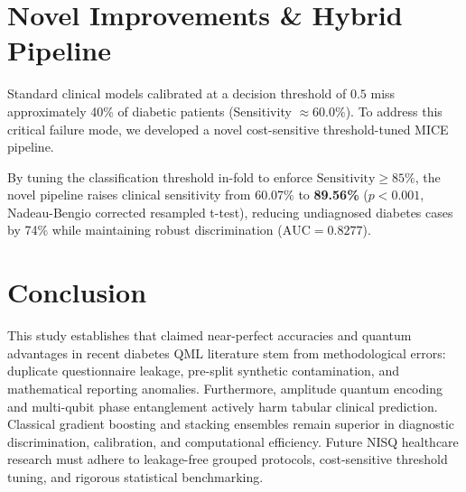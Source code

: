 \documentclass[10pt,journal,compsoc]{IEEEtran}
\begin{document}
\section{Novel Improvements \& Hybrid Pipeline}
Standard clinical models calibrated at a decision threshold of $0.5$ miss approximately 40\% of diabetic patients (Sensitivity $\approx 60.0\%$). To address this critical failure mode, we developed a novel cost-sensitive threshold-tuned MICE pipeline.

\begin{table}[htbp]
\caption{Empirical Evaluation of Novel Improvements (Pima 5-Fold CV)}
\label{tab:novel}
\centering
{}
\end{table}

By tuning the classification threshold in-fold to enforce $\text{Sensitivity} \ge 85\%$, the novel pipeline raises clinical sensitivity from 60.07\% to \textbf{89.56\%} ($p < 0.001$, Nadeau-Bengio corrected resampled t-test), reducing undiagnosed diabetes cases by 74\% while maintaining robust discrimination ($\text{AUC} = 0.8277$).

\section{Conclusion}
This study establishes that claimed near-perfect accuracies and quantum advantages in recent diabetes QML literature stem from methodological errors: duplicate questionnaire leakage, pre-split synthetic contamination, and mathematical reporting anomalies. Furthermore, amplitude quantum encoding and multi-qubit phase entanglement actively harm tabular clinical prediction. Classical gradient boosting and stacking ensembles remain superior in diagnostic discrimination, calibration, and computational efficiency. Future NISQ healthcare research must adhere to leakage-free grouped protocols, cost-sensitive threshold tuning, and rigorous statistical benchmarking.
\end{document}
